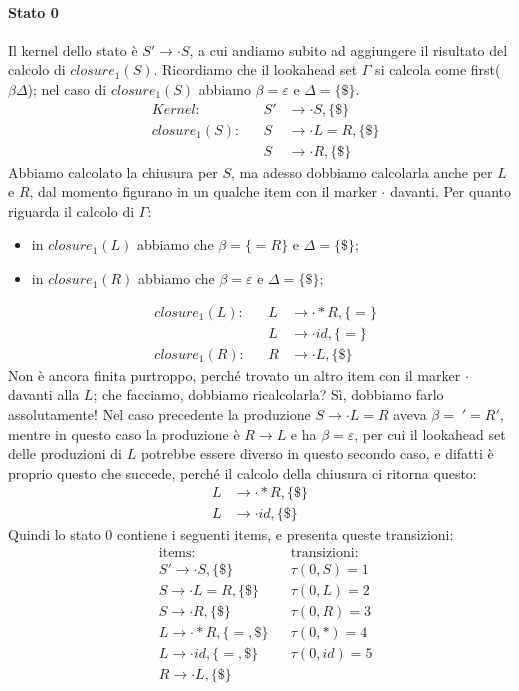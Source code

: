\documentclass[class=book, crop=false, oneside, 12pt]{standalone}
\begin{document}
\paragraph{Stato 0}
Il kernel dello stato è \(S' \to \cdot S\), a cui andiamo subito ad aggiungere il risultato del calcolo di \(closure_1(S)\). Ricordiamo che il lookahead set \(\Gamma\) si calcola come first(\(\beta\Delta\)); nel caso di \(closure_1(S)\) abbiamo \(\beta = \varepsilon\) e \(\Delta = \{\$\}\).
\begin{align*}
    &&Kernel: &&S' &\to \cdot S, \{\$\}& \\
    &&closure_1(S): &&S &\to \cdot L = R, \{\$\} &\\
    && &&S &\to \cdot R, \{\$\} &
\end{align*}
Abbiamo calcolato la chiusura per \(S\), ma adesso  dobbiamo calcolarla anche per \(L\) e \(R\), dal momento figurano in un qualche item con il marker \(\cdot\) davanti. Per quanto riguarda il calcolo di \(\Gamma\):
\begin{itemize}
    \item in \(closure_1(L)\) abbiamo che \(\beta = \{=R\}\) e \(\Delta = \{\$\}\);
    \item in \(closure_1(R)\) abbiamo che \(\beta = \varepsilon\) e \(\Delta = \{\$\}\);
\end{itemize}
\begin{align*}
    &&closure_1(L): &&L &\to \cdot \ast R, \{=\} &\\
    && &&L &\to \cdot id, \{=\} &\\
    &&closure_1(R): &&R &\to \cdot L, \{\$\}&
\end{align*}
Non è ancora finita purtroppo, perché trovato un altro item con il marker \(\cdot\) davanti alla \(L\); che facciamo, dobbiamo ricalcolarla? Sì, dobbiamo farlo assolutamente! Nel caso precedente la produzione \(S \to \cdot L = R\) aveva \(\beta = \; '=R'\), mentre in questo caso la produzione è \(R \to L\) e ha \(\beta = \varepsilon\), per cui il lookahead set delle produzioni di \(L\) potrebbe essere diverso in questo secondo caso, e difatti è proprio questo che succede, perché il calcolo della chiusura ci ritorna questo:
\begin{align*}
    L &\to \cdot \ast R, \{\$\} \\
    L &\to \cdot id, \{\$\}
\end{align*}
Quindi lo stato 0 contiene i seguenti items, e presenta queste transizioni:
\begin{align*}
    &\textrm{items:} & &\textrm{transizioni:} \\
    &S' \to \cdot S, \{\$\}  & &\tau(0, S) = 1 \\
    &S \to \cdot L = R, \{\$\}  & &\tau(0, L) = 2 \\
    &S \to \cdot R, \{\$\}  & &\tau(0, R) = 3 \\
    &L \to \cdot \ast R, \{=, \$\}  & &\tau(0, \ast) = 4 \\
    &L \to \cdot id, \{=, \$\}  & &\tau(0, id) = 5 \\
    &R \to \cdot L, \{\$\}  & &
\end{align*}
\end{document}
